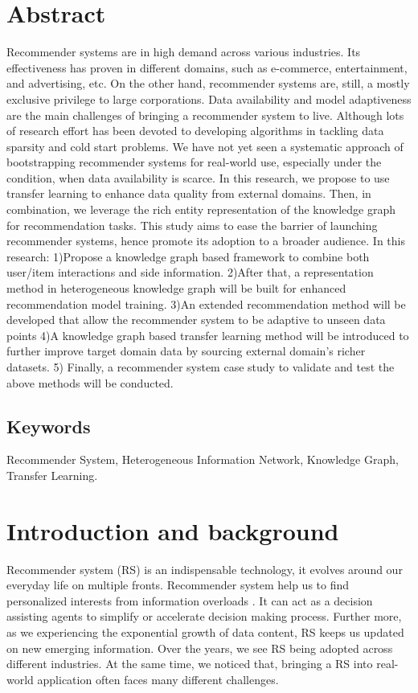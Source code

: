 
\section*{Abstract}
Recommender systems are in high demand across various industries. Its effectiveness has proven in different domains, such as e-commerce, entertainment, and advertising, etc. On the other hand, recommender systems are, still, a mostly exclusive privilege to large corporations. Data availability and model adaptiveness are the main challenges of bringing a recommender system to live. Although lots of research effort has been devoted to developing algorithms in tackling data sparsity and cold start problems. We have not yet seen a systematic approach of bootstrapping recommender systems for real-world use, especially under the condition, when data availability is scarce. In this research, we propose to use transfer learning to enhance data quality from external domains. Then, in combination, we leverage the rich entity representation of the knowledge graph for recommendation tasks. This study aims to ease the barrier of launching recommender systems, hence promote its adoption to a broader audience. In this research: 1)Propose a knowledge graph based framework to combine both user/item interactions and side information. 2)After that, a representation method in heterogeneous knowledge graph will be built for enhanced recommendation model training. 3)An extended recommendation method will be developed that allow the recommender system to be adaptive to unseen data points 4)A knowledge graph based transfer learning method will be introduced to further improve target domain data by sourcing external domain's richer datasets. 5) Finally, a recommender system case study to validate and test the above methods will be conducted.

\subsection*{Keywords} 
Recommender System, Heterogeneous Information Network, Knowledge Graph, Transfer Learning. 

\section{Introduction and background}
Recommender system (RS) is an indispensable technology, it evolves around our everyday life on multiple fronts. Recommender system help us to find personalized interests from information overloads \citep{Lu2015}. It can act as a decision assisting agents to simplify or accelerate decision making process. Further more, as we experiencing the exponential growth of data content, RS keeps us updated on new emerging information.
Over the years, we see RS being adopted across different industries. At the same time, we noticed that, bringing a RS into real-world application often faces many different challenges. 

